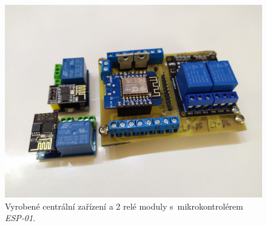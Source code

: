 \begin{figure}[hbt]
    \centering
    \includegraphics[width=0.9\linewidth]{obrazky-figures/testDevice.jpg}
    \caption{Vyrobené centrální zařízení a 2 relé moduly s~mikrokontrolérem \emph{ESP-01}.}
    \label{fig:dev:actual}
\end{figure}